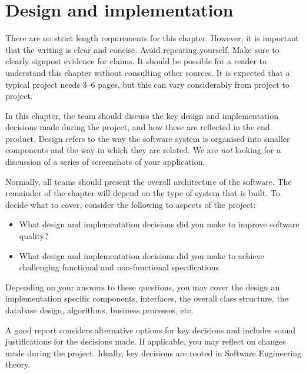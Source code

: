 \chapter{Design and implementation}
\label{chap:design-and-implementation}


\begin{length}
There are no strict length requirements for this chapter.  However, it is important that the writing is clear and concise.  Avoid repeating yourself.  Make sure to clearly signpost evidence for claims.  It should be possible for a reader to understand this chapter without consulting other sources.  It is expected that a typical project needs 3--6 pages, but this can vary considerably from project to project.
\end{length}

\begin{expectations}
In this chapter, the team should discuss the key design and implementation decisions made during the project, and how these are reflected in the end product.  Design refers to the way the software system is organised into smaller components and the way in which they are related.  We are \emph{not} looking for a discussion of a series of screenshots of your application.

Normally, all teams should present the overall architecture of the software.  The remainder of the chapter will depend on the type of system that is built.  To decide what to cover, consider the following to aspects of the project:
\begin{itemize}
\item What design and implementation decisions did you make to improve software quality?
\item What design and implementation decisions did you make to achieve challenging functional and non-functional specifications
\end{itemize}
Depending on your answers to these questions, you may cover the design an implementation specific components, interfaces, the overall class structure, the database design, algorithms, business processes, etc.

A good report considers alternative options for key decisions and includes sound justifications for the decisions made.  If applicable, you may reflect on changes made during the project.  Ideally, key decisions are rooted in Software Engineering theory.
\end{expectations}


